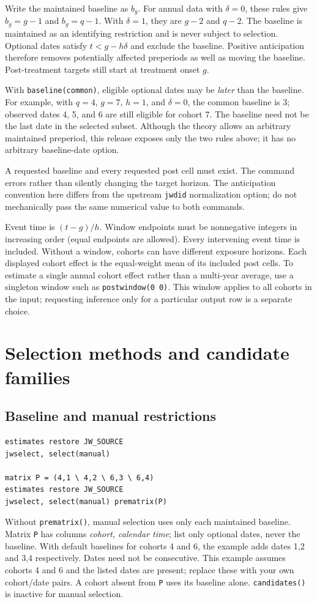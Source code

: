 \documentclass[11pt]{article}
\newcommand{\cmd}[1]{\texttt{#1}}
\begin{document}
Write the maintained baseline as $b_g$. For annual data with $\delta=0$,
these rules give $b_g=g-1$ and $b_g=q-1$.
With $\delta=1$, they are $g-2$ and $q-2$. The baseline is maintained as an
identifying restriction and is never subject to selection. Optional dates
satisfy $t<g-h\delta$ and exclude the baseline. Positive anticipation therefore
removes potentially affected preperiods as well as moving the baseline.
Post-treatment targets still start at treatment onset $g$.

With \cmd{baseline(common)}, eligible optional dates may be \emph{later}
than the baseline. For example, with $q=4$, $g=7$, $h=1$, and $\delta=0$,
the common baseline is 3; observed dates 4, 5, and 6 are still eligible for
cohort 7. The baseline need not be the last date in the selected subset.
Although the theory allows an arbitrary maintained preperiod, this release
exposes only the two rules above; it has no arbitrary baseline-date option.

A requested baseline and every requested post cell must exist. The command
errors rather than silently changing the target horizon. The anticipation
convention here differs from the upstream \cmd{jwdid} normalization option;
do not mechanically pass the same numerical value to both commands.

Event time is $(t-g)/h$. Window endpoints must be nonnegative integers in
increasing order (equal endpoints are allowed). Every intervening event time
is included. Without a window, cohorts can have different exposure horizons.
Each displayed cohort effect is the equal-weight mean of its included post
cells. To estimate a single annual cohort effect rather than a multi-year
average, use a singleton window such as \cmd{postwindow(0 0)}. This window
applies to all cohorts in the input; requesting inference only for a particular
output row is a separate choice.

\section{Selection methods and candidate families}
\subsection{Baseline and manual restrictions}
\begin{lstlisting}
estimates restore JW_SOURCE
jwselect, select(manual)

matrix P = (4,1 \ 4,2 \ 6,3 \ 6,4)
estimates restore JW_SOURCE
jwselect, select(manual) prematrix(P)
\end{lstlisting}
Without \cmd{prematrix()}, manual selection uses only each maintained
baseline. Matrix \cmd{P} has columns \emph{cohort, calendar time}; list only
optional dates, never the baseline. With default baselines for cohorts 4 and 6,
the example adds dates 1,2 and 3,4 respectively. Dates need not be consecutive.
This example assumes cohorts 4 and 6 and the listed dates are present;
replace these with your own cohort/date pairs. A cohort absent from \cmd{P}
uses its baseline alone.
\cmd{candidates()} is inactive for manual selection.
\end{document}
